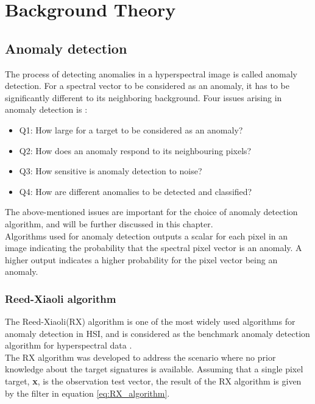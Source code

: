 \newpage
\chapter{Background Theory}
\label{sec:theory}

\section{Anomaly detection}
\label{sec:anomaly_detectors_theory}
The process of detecting anomalies in a hyperspectral image is called anomaly detection. For a spectral vector to be considered as an anomaly, it has to be significantly different to its neighboring background. Four issues arising in anomaly detection is \cite{chang2006characterization}:
\\
 
\begin{itemize}
  \item Q1: How large for a target to be considered as an anomaly?
  \item Q2: How does an anomaly respond to its neighbouring pixels?
  \item Q3: How sensitive is anomaly detection to noise?
  \item Q4: How are different anomalies to be detected and classified?
\end{itemize}

The above-mentioned issues are important for the choice of anomaly detection algorithm, and will be further discussed in this chapter.
\\
Algorithms used for anomaly detection outputs a scalar for each pixel in an image indicating the probability that the spectral pixel vector is an anomaly. A higher output indicates a higher probability for the pixel vector being an anomaly.


\subsection{Reed-Xiaoli algorithm}
\label{sec:RX_theory}
The Reed-Xiaoli(RX) algorithm \cite{reed1990adaptive} is one of the most widely used algorithms for anomaly detection in HSI, and is considered as the benchmark anomaly detection algorithm for hyperspectral data \cite{yang2015dual}.  
\\
The RX algorithm was developed to address the scenario where no prior knowledge about the target signatures is available. Assuming that a single pixel target, \textbf{x}, is the observation test vector, the result of the RX algorithm is given by the filter in equation \ref{eq:RX_algorithm}.

